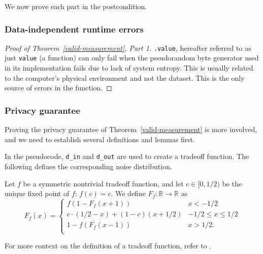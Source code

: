 \documentclass{article}
\begin{document}
\begin{theorem}
    \label{valid-measurement}
\end{theorem}

We now prove each part in the postcondition.
\subsubsection*{Data-independent runtime errors}
\begin{proof}[Proof of Theorem~\ref{valid-measurement}, Part 1]
\label{data-independent-error}
\texttt{.value}, 
hereafter referred to as just \texttt{value} (a function) 
can only fail when the pseudorandom byte generator used in its implementation fails due to lack of system entropy. 
This is usually related to the computer's physical environment and not the dataset. 
This is the only source of errors in the function.
\end{proof}

\subsubsection*{Privacy guarantee}
Proving the privacy guarantee of Theorem~\ref{valid-measurement} is more involved, 
and we need to establish several definitions and lemmas first.

In the pseudocode, \texttt{d\_in} and \texttt{d\_out} are used to create a tradeoff function.  
The following defines the corresponding noise distribution.
\begin{definition}
    \label{def-3-7}  %
    Let $f$ be a symmetric nontrivial tradeoff function, and let {$c\in [0,1/2)$} be the unique fixed point of $f$: $f(c)=c$. 
    We define $F_f:\mathbb{R}\rightarrow \mathbb{R}$ as  \[ F_f(x) = \begin{cases}
        f(1-F_f(x+1))&x<-1/2\\
        c \cdot (1/2-x) + (1-c)(x+1/2)&-1/2\leq x\leq 1/2\\
        1-f(F_f(x-1))&x>1/2.\\
    \end{cases}\]
\end{definition}
For more context on the definition of a tradeoff function, refer to \cite{awan2023canonical}.
\end{document}

